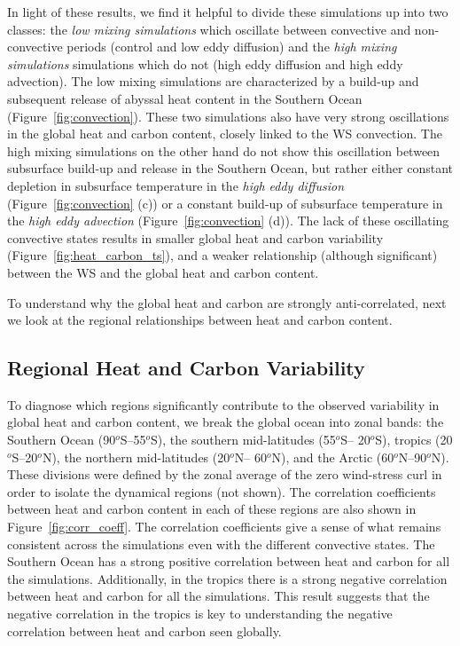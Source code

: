 In light of these results, we find it helpful to divide these simulations up
into two classes: the \textit{low mixing simulations} which oscillate between
convective and non-convective periods (control and low eddy diffusion) and the
\textit{high mixing simulations} simulations which do not (high eddy diffusion
and high eddy advection). The low mixing simulations are characterized by a
build-up and subsequent release of abyssal heat content in the Southern Ocean
(Figure~\ref{fig:convection}). These two simulations also have very strong
oscillations in the global heat and carbon content, closely linked to the WS
convection. The high mixing simulations on the other hand do not show
this oscillation between subsurface build-up and release in the Southern Ocean,
but rather either constant depletion in subsurface temperature in the
\textit{high eddy diffusion} (Figure~\ref{fig:convection} (c)) or a constant
build-up of subsurface temperature in the \textit{high eddy advection}
(Figure~\ref{fig:convection} (d)). The lack of these oscillating convective
states results in smaller global heat and carbon variability
(Figure~\ref{fig:heat_carbon_ts}), and a weaker relationship (although
significant) between the WS and the global heat and carbon content.

To understand why the global heat and carbon are strongly anti-correlated, next
we look at the regional relationships between heat and carbon content.


\subsection{Regional Heat and Carbon Variability}
To diagnose which regions significantly contribute to the observed variability
in global heat and carbon content, we break the global ocean into zonal bands:
the Southern Ocean (90$^o$S--55$^o$S), the southern mid-latitudes (55$^o$S--
20$^o$S), tropics (20$^o$S--20$^o$N), the northern mid-latitudes (20$^o$N--
60$^o$N), and the Arctic (60$^o$N--90$^o$N). These divisions were defined by the
zonal average of the zero wind-stress curl in order to isolate the dynamical
regions (not shown). The correlation coefficients
between heat and carbon content in each of these regions are also shown in
Figure~\ref{fig:corr_coeff}. The correlation coefficients give a sense of what
remains consistent across the simulations even with the different convective
states. The Southern Ocean has a strong positive correlation between heat and
carbon for all the simulations. Additionally, in the tropics there is a strong
negative correlation between heat and carbon for all the simulations. This
result suggests that the negative correlation in the tropics is key to
understanding the negative correlation between heat and carbon seen globally.

